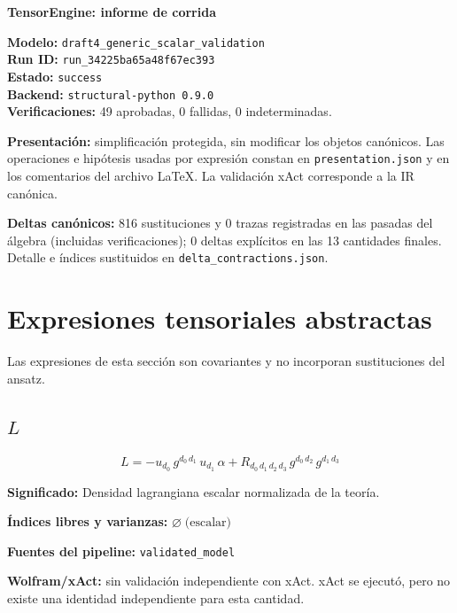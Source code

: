 \documentclass[11pt]{article}
\begin{document}
\begin{center}
{\Large\bfseries TensorEngine: informe de corrida}
\end{center}
\textbf{Modelo:} \texttt{draft4\_generic\_scalar\_validation}\\
\textbf{Run ID:} \texttt{run\_34225ba65a48f67ec393}\\
\textbf{Estado:} \texttt{success}\\
\textbf{Backend:} \texttt{structural-python 0.9.0}\\
\textbf{Verificaciones:} 49 aprobadas, 0 fallidas, 0 indeterminadas.
\par\smallskip
\textbf{Presentación:} simplificación protegida, sin modificar los objetos canónicos. Las operaciones e hipótesis usadas por expresión constan en \texttt{presentation.json} y en los comentarios del archivo LaTeX. La validación xAct corresponde a la IR canónica.\par
\textbf{Deltas canónicos:} 816 sustituciones y 0 trazas registradas en las pasadas del álgebra (incluidas verificaciones); 0 deltas explícitos en las 13 cantidades finales. Detalle e índices sustituidos en \texttt{delta\_contractions.json}.\par
\section*{Expresiones tensoriales abstractas}
Las expresiones de esta sección son covariantes y no incorporan sustituciones del ansatz.
\subsection*{$ L $}
\begin{dmath*}[breakdepth={5}]
L = -u{}_{d_{0}}\,g{}^{d_{0}\,d_{1}}\,u{}_{d_{1}}\,\alpha + R{}_{d_{0}\,d_{1}\,d_{2}\,d_{3}}\,g{}^{d_{0}\,d_{2}}\,g{}^{d_{1}\,d_{3}}
\end{dmath*}
\par\vspace{1.2\baselineskip}\noindent
\begin{minipage}{\linewidth}
\textbf{Significado:} Densidad lagrangiana escalar normalizada de la teoría.\par
\textbf{Índices libres y varianzas:} $ \varnothing\;\text{(escalar)} $\par
\textbf{Fuentes del pipeline:} \texttt{validated\_model}\par
\textbf{Wolfram/xAct:} sin validación independiente con xAct. xAct se ejecutó, pero no existe una identidad independiente para esta cantidad.\par
\end{minipage}
\end{document}
